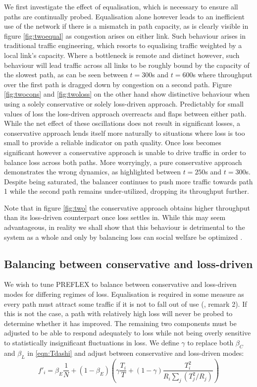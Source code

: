 We first investigate the effect of equalisation, which is necessary to ensure all paths are continually probed. 
Equalisation alone however leads to an inefficient use of the network if there is a mismatch in path capacity, as is clearly visible in figure \ref{fig:twoequal} as congestion arises on either link. 
Such behaviour arises in traditional traffic engineering, which resorts to equalising traffic weighted by a local link's capacity.  
Where a bottleneck is remote and distinct however, such behaviour will lead traffic across all links to be roughly bound by the capacity of the slowest path, as can be seen between $t=300$s and $t=600$s where throughput over the first path is dragged down by congestion on a second path.  
Figure \ref{fig:twocons} and \ref{fig:twoloss} on the other hand show distinctive behaviour when using a solely conservative or solely loss-driven approach. 
Predictably for small values of loss the loss-driven approach overreacts and flaps between either path. 
While the net effect of these oscillations does not result in significant losses, a conservative approach lends itself more naturally to situations where loss is too small to provide a reliable indicator on path quality. 
Once loss becomes significant however a conservative approach is unable to drive traffic in order to balance loss across both paths. 
More worryingly, a pure conservative approach demonstrates the wrong dynamics, as highlighted between $t=250$s and $t=300$s. 
Despite being saturated, the balancer continues to push more traffic towards path 1 while the second path remains under-utilized, dropping its throughput further.

Note that in figure \ref{fig:two} the conservative approach obtains higher throughput than its loss-driven counterpart once loss settles in. 
While this may seem advantageous, in reality we shall show that this behaviour is detrimental to the system as a whole and only by balancing loss can social welfare be optimized \cite{Kelly:2005p140}. 

\subsection{Balancing between conservative and loss-driven}

We wish to tune \ac{PREFLEX} to balance between conservative and loss-driven modes for differing regimes of loss. 
Equalisation is required in some measure as every path must attract some traffic if it is not to fall out of use (\cite{Kelly:2005p140}, remark 2). 
If this is not the case, a path with relatively high loss will never be probed to determine whether it has improved. 
The remaining two components must be adjusted to be able to respond adequately to loss while not being overly sensitive to statistically insignificant fluctuations in loss. 
We define $\gamma$ to replace both $\beta_C$ and $\beta_L$ in \eqref{eqn:Tdashi} and adjust between conservative and loss-driven modes:
\begin{equation}
f'_i = \beta_E \frac{1}{N} + \left( 1-\beta_E \right) \left(
\gamma \frac{T_i}{T} + \left(1-\gamma\right) \frac{T_i^2}{R_i \sum_j
(T_j^2/R_j)} \right)
\label{eqn:gamma}
\end{equation}

